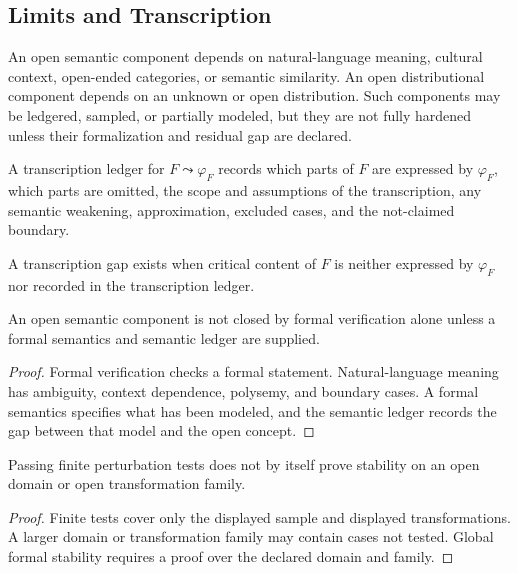 \subsection{Limits and Transcription}
\label{subsec:philosophy-formal-verification-limits-transcription}

\begin{definition}
\label{def:philosophy-open-semantic-distributional-components}
An open semantic component depends on natural-language meaning, cultural
context, open-ended categories, or semantic similarity. An open
distributional component depends on an unknown or open distribution.
Such components may be ledgered, sampled, or partially modeled, but they
are not fully hardened unless their formalization and residual gap are
declared.
\end{definition}

\begin{definition}
\label{def:philosophy-transcription-ledger}
A transcription ledger for $F\leadsto\varphi_F$ records which parts of
$F$ are expressed by $\varphi_F$, which parts are omitted, the scope and
assumptions of the transcription, any semantic weakening, approximation,
excluded cases, and the not-claimed boundary.
\end{definition}

\begin{definition}
\label{def:philosophy-transcription-gap}
A transcription gap exists when critical content of $F$ is neither
expressed by $\varphi_F$ nor recorded in the transcription ledger.
\end{definition}

\begin{theorem}
\label{thm:philosophy-open-semantics-not-closed-by-proof-alone}
An open semantic component is not closed by formal verification alone
unless a formal semantics and semantic ledger are supplied.
\end{theorem}
\begin{proof}
Formal verification checks a formal statement. Natural-language meaning
has ambiguity, context dependence, polysemy, and boundary cases. A
formal semantics specifies what has been modeled, and the semantic
ledger records the gap between that model and the open concept.
\end{proof}

\begin{theorem}
\label{thm:philosophy-empirical-stability-not-global-formal-stability}
Passing finite perturbation tests does not by itself prove stability on
an open domain or open transformation family.
\end{theorem}
\begin{proof}
Finite tests cover only the displayed sample and displayed
transformations. A larger domain or transformation family may contain
cases not tested. Global formal stability requires a proof over the
declared domain and family.
\end{proof}


